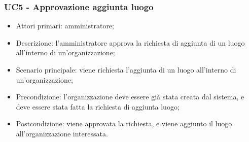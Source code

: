 \subsubsection{UC5 - Approvazione aggiunta luogo}

\begin{itemize}
\item Attori primari: amministratore;
\item Descrizione: l'amministratore approva la richiesta di aggiunta di un luogo all'interno di un'organizzazione;
\item Scenario principale: viene richiesta l'aggiunta di un luogo all'interno di un'organizzazione;
\item Precondizione: l'organizzazione deve essere già stata creata dal sistema, e deve essere stata fatta la richiesta di aggiunta luogo;
\item Postcondizione: viene approvata la richiesta, e viene aggiunto il luogo all'organizzazione interessata.

\end{itemize}